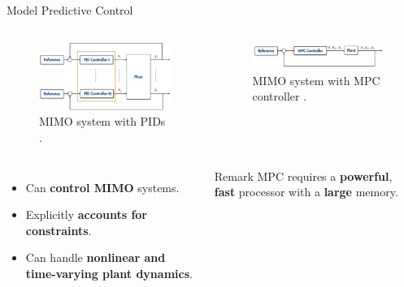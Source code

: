 \documentclass{thesisbeamer}
\begin{document}
\begin{frame}[t]{Model Predictive Control}
\begin{columns}


\begin{figure}[t]
	\centering
	\includegraphics[width=\textwidth]{Images/Control/5}
	\caption{MIMO system with PIDs \cite{MathWorks2018_new}.}
\end{figure}


\begin{figure}[t]
	\centering
	\includegraphics[width=\textwidth]{Images/Control/6}
	\caption{MIMO system with MPC controller \cite{MathWorks2018_new}.}
\end{figure}

\end{columns}





\begin{columns}
\begin{itemize}[<+->]
	\item Can \textbf{control MIMO} systems.
	\item Explicitly \textbf{accounts for constraints}.
	\item Can handle \textbf{nonlinear and time-varying plant dynamics}.

\vspace{3cm}	
	
\end{itemize}

\begin{alertblock}{Remark}
\vspace{0.5em}
MPC requires a \textbf{powerful}, \textbf{fast} processor with a \textbf{large} memory.
\vspace{0.5em}
\end{alertblock}

\vspace{3cm}

\end{columns}
\end{frame}
\end{document}
